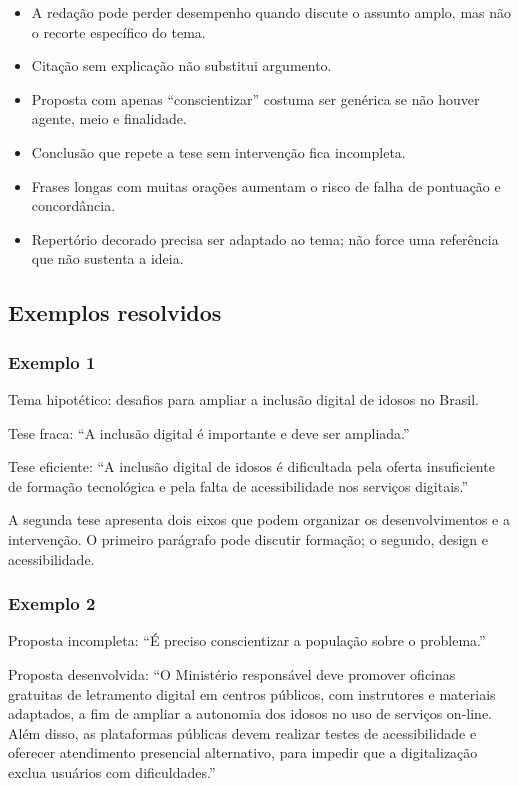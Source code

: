 \documentclass[11pt,a4paper]{article}
\begin{document}
\begin{itemize}
  \item A redação pode perder desempenho quando discute o assunto amplo, mas não o recorte específico do tema.
  \item Citação sem explicação não substitui argumento.
  \item Proposta com apenas “conscientizar” costuma ser genérica se não houver agente, meio e finalidade.
  \item Conclusão que repete a tese sem intervenção fica incompleta.
  \item Frases longas com muitas orações aumentam o risco de falha de pontuação e concordância.
  \item Repertório decorado precisa ser adaptado ao tema; não force uma referência que não sustenta a ideia.
\end{itemize}

\subsection*{Exemplos resolvidos}

\subsubsection*{Exemplo 1}

Tema hipotético: desafios para ampliar a inclusão digital de idosos no Brasil.

Tese fraca: “A inclusão digital é importante e deve ser ampliada.”

Tese eficiente: “A inclusão digital de idosos é dificultada pela oferta insuficiente de formação tecnológica e pela falta de acessibilidade nos serviços digitais.”

A segunda tese apresenta dois eixos que podem organizar os desenvolvimentos e a intervenção. O primeiro parágrafo pode discutir formação; o segundo, design e acessibilidade.

\subsubsection*{Exemplo 2}

Proposta incompleta: “É preciso conscientizar a população sobre o problema.”

Proposta desenvolvida: “O Ministério responsável deve promover oficinas gratuitas de letramento digital em centros públicos, com instrutores e materiais adaptados, a fim de ampliar a autonomia dos idosos no uso de serviços on-line. Além disso, as plataformas públicas devem realizar testes de acessibilidade e oferecer atendimento presencial alternativo, para impedir que a digitalização exclua usuários com dificuldades.”
\end{document}
